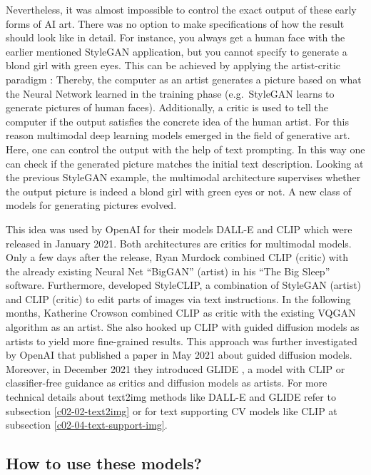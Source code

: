 \documentclass[
]{krantz}
\begin{document}
Nevertheless, it was almost impossible to control the exact output of these early forms of AI art. There was no option to make specifications of how the result should look like in detail. For instance, you always get a human face with the earlier mentioned StyleGAN application, but you cannot specify to generate a blond girl with green eyes. This can be achieved by applying the artist-critic paradigm \citep{8477754}: Thereby, the computer as an artist generates a picture based on what the Neural Network learned in the training phase (e.g.~StyleGAN learns to generate pictures of human faces). Additionally, a critic is used to tell the computer if the output satisfies the concrete idea of the human artist. For this reason multimodal deep learning models emerged in the field of generative art. Here, one can control the output with the help of text prompting. In this way one can check if the generated picture matches the initial text description. Looking at the previous StyleGAN example, the multimodal architecture supervises whether the output picture is indeed a blond girl with green eyes or not. A new class of models for generating pictures evolved.

This idea was used by OpenAI for their models DALL-E \citep{DALLE} and CLIP \citep{CLIP} which were released in January 2021. Both architectures are critics for multimodal models. Only a few days after the release, Ryan Murdock combined CLIP (critic) with the already existing Neural Net ``BigGAN'' (artist) in his ``The Big Sleep'' software. Furthermore, \citet{StyleGAN} developed StyleCLIP, a combination of StyleGAN (artist) and CLIP (critic) to edit parts of images via text instructions. In the following months, Katherine Crowson combined CLIP as critic with the existing VQGAN algorithm as an artist. She also hooked up CLIP with guided diffusion models as artists to yield more fine-grained results. This approach was further investigated by OpenAI that published a paper \citep{DiffusionModels} in May 2021 about guided diffusion models. Moreover, in December 2021 they introduced GLIDE \citep{GLIDE}, a model with CLIP or classifier-free guidance as critics and diffusion models as artists. For more technical details about text2img methods like DALL-E and GLIDE refer to subsection \ref{c02-02-text2img}
or for text supporting CV models like CLIP at subsection \ref{c02-04-text-support-img}.

\hypertarget{how-to-use-these-models}{%
\subsection{How to use these models?}\label{how-to-use-these-models}}
\end{document}
